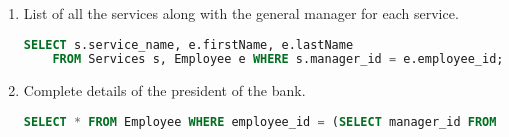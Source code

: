 \documentclass[letterpaper, 12pt]{article}
\begin{document}
\begin{enumerate}[label=(\alph*)]
\begin{lstlisting}[language=sql]
  \end{lstlisting}
  \item List of all the services along with the general manager for each service.
    \begin{lstlisting}[language=sql]
SELECT s.service_name, e.firstName, e.lastName 
	FROM Services s, Employee e WHERE s.manager_id = e.employee_id;
  \end{lstlisting}
  \item Complete details of the president of the bank.
    \begin{lstlisting}[language=sql]
SELECT * FROM Employee WHERE employee_id = (SELECT manager_id FROM Branch WHERE isHeadOffice = 1);
  \end{lstlisting}

\end{enumerate}
\end{document}
